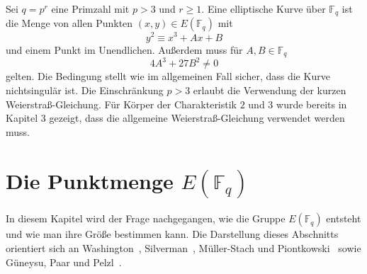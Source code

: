 \begin{definition}
    Sei $q=p^r$ eine Primzahl mit \(p>3\) und $r\geq1$. Eine elliptische Kurve über \(\mathbb F_q\) ist die Menge von allen Punkten $(x,y)\in E(\mathbb{F}_q)$ mit
    \[
        y^2 \equiv x^3+Ax+B
    \]
    und einem Punkt im Unendlichen. Außerdem muss für $A,B\in\mathbb{F}_q$
    \[
        4A^3+27B^2 \neq 0
    \]
    gelten. Die Bedingung stellt wie im allgemeinen Fall sicher, dass die Kurve nichtsingulär ist. Die Einschränkung $p>3$ erlaubt die Verwendung der kurzen Weierstraß-Gleichung. Für Körper der Charakteristik \(2\) und \(3\) wurde bereits in Kapitel 3 gezeigt, dass die allgemeine Weierstraß-Gleichung verwendet werden muss.
\end{definition}

\section{Die Punktmenge \texorpdfstring{$E(\mathbb F_q)$}{E (Fq)}}
In diesem Kapitel wird der Frage nachgegangen, wie die Gruppe $E(\mathbb{F}_q)$ entsteht und wie man ihre Größe bestimmen kann. Die Darstellung dieses Abschnitts orientiert sich an Washington~\cite[S.~77--79, 95 und 104--105]{washington08}, Silverman~\cite[S.~29]{silverman06}, Müller-Stach und Piontkowski~\cite[S.~51~ff.]{muller} sowie Güneysu, Paar und Pelzl~\cite[S.~285~f.]{guneysu24}.
